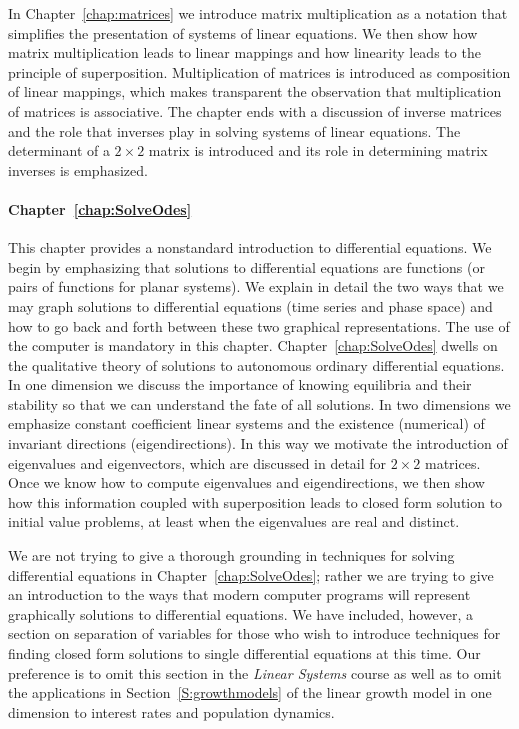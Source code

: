 In Chapter~\ref{chap:matrices} we introduce matrix multiplication as a
notation that simplifies the presentation of systems of linear equations.
We then show how matrix multiplication leads to linear mappings and how    
linearity leads to the principle of superposition.  Multiplication of 
matrices is introduced as composition of linear mappings, which makes 
transparent the observation that multiplication of matrices is associative.  
The chapter ends with a discussion of inverse matrices and the role that
inverses play in solving systems of linear equations.  The determinant of 
a $2\times 2$ matrix is introduced and its role in determining matrix
inverses is emphasized. 

\paragraph{Chapter~\ref{chap:SolveOdes}} This chapter provides a nonstandard 
introduction to differential equations.  We begin by emphasizing that 
solutions to differential equations are functions (or pairs of functions for 
planar systems).  We explain in detail the two ways that we may graph 
solutions to differential equations (time series and phase space) and how to 
go back and forth between these two graphical representations.  The use of 
the computer is mandatory in this chapter.  Chapter~\ref{chap:SolveOdes} 
dwells on the qualitative theory of solutions to autonomous ordinary 
differential equations.  In one dimension we discuss the importance of 
knowing equilibria and their stability so that we can understand the fate of 
all solutions.  In two dimensions we emphasize constant coefficient linear 
systems and the existence (numerical) of invariant directions 
(eigendirections).  In this way we motivate the introduction of eigenvalues 
and eigenvectors, which are discussed in detail for $2\times 2$ matrices.  
Once we know how to compute eigenvalues and eigendirections, we then show how
this information coupled with superposition leads to closed form solution to
initial value problems, at least when the eigenvalues are real and distinct.

We are not trying 
to give a thorough grounding in techniques for solving differential equations 
in Chapter~\ref{chap:SolveOdes}; rather we are trying to give an introduction 
to the ways that modern computer programs will represent graphically 
solutions to differential equations.  We have included, however, a section on 
separation of variables for those who wish to introduce techniques for 
finding closed form solutions to single differential equations at this time.  
Our preference is to omit this section in the {\em Linear Systems\/} course 
as well as to omit the applications in Section~\ref{S:growthmodels} of the 
linear growth model in one dimension to interest rates and population 
dynamics.  

